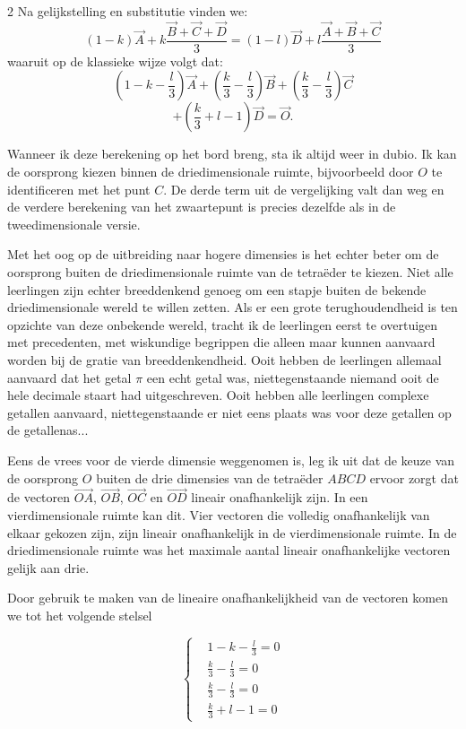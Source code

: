 \begin{multicols}{2}
Na gelijkstelling en substitutie vinden we:
 \[(1-k) \vec{A} + k \frac{\vec{B}+\vec{C}+\vec{D}}{3}=(1-l) \vec{D} + l \frac{\vec{A}+\vec{B}+\vec{C}}{3}\]
 waaruit op de klassieke wijze volgt dat:
 \[ \left( 1-k-\frac{l}{3} \right) \vec{A}+\left(\frac{k}{3}-\frac{l}{3}\right) \vec{B}+\left(\frac{k}{3}-\frac{l}{3}\right) \vec{C}\]
 \[+\left(\frac{k}{3}+l-1 \right) \vec{D}=\vec{O}.\]

Wanneer ik deze berekening op het bord breng, sta ik altijd weer in dubio. Ik kan de oorsprong kiezen binnen de driedimensionale ruimte, bijvoorbeeld door $O$ te identificeren met het punt $C$. De derde term uit de vergelijking valt dan weg en de verdere berekening van het zwaartepunt is precies dezelfde als in de tweedimensionale versie.

Met het oog op de uitbreiding naar hogere dimensies is het echter beter om de oorsprong buiten de driedimensionale ruimte van de tetraëder te kiezen. Niet alle leerlingen zijn echter breeddenkend genoeg om een stapje buiten de bekende driedimensionale wereld te willen zetten. Als er een grote terughoudendheid is ten opzichte van deze onbekende wereld, tracht ik de leerlingen eerst te overtuigen met precedenten, met wiskundige begrippen die alleen maar kunnen aanvaard worden bij de gratie van breeddenkendheid. Ooit hebben de leerlingen allemaal aanvaard dat het getal $\pi$ een echt getal was, niettegenstaande niemand ooit de hele decimale staart had uitgeschreven. Ooit hebben alle leerlingen complexe getallen aanvaard, niettegenstaande er niet eens plaats was voor deze getallen op de getallenas...

Eens de vrees voor de vierde dimensie weggenomen is, leg ik uit dat de keuze van de oorsprong $O$ buiten de drie dimensies van de tetraëder $ABCD$ ervoor zorgt dat de vectoren $\vec{OA}$, $\vec{OB}$, $\vec{OC}$ en $\vec{OD}$ lineair onafhankelijk zijn. In een vierdimensionale ruimte kan dit. Vier vectoren die volledig onafhankelijk van elkaar gekozen zijn, zijn lineair onafhankelijk in de vierdimensionale ruimte. In de driedimensionale ruimte was het maximale aantal lineair onafhankelijke vectoren gelijk aan drie. 

Door gebruik te maken van de lineaire onafhankelijkheid van de vectoren komen we tot het volgende stelsel

\[ \left\{ 
	\begin{aligned}
	& 1-k-\frac{l}{3} =0 \\
	& \frac{k}{3}-\frac{l}{3}=0 \\
	& \frac{k}{3}-\frac{l}{3}=0 \\
	& \frac{k}{3}+l-1=0
	\end{aligned}  
	\right. \]
	

\end{multicols}
